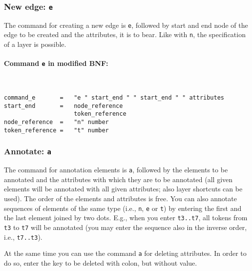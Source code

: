 \documentclass[12pt]{scrartcl}
\begin{document}
\subsubsection{New edge: \texttt{e}}

The command for creating a new edge is \texttt{e}, followed by start and end node of the edge to be created and the attributes, it is to bear.
Like with \texttt{n}, the specification of a layer is possible.

\paragraph*{Command \texttt{e} in modified BNF:}
~
\begin{framed}
\begin{lstlisting}
command_e       =   "e " start_end " " start_end " " attributes
start_end       =   node_reference
                    token_reference
node_reference  =   "n" number
token_reference =   "t" number
\end{lstlisting}
\end{framed}


\subsubsection{Annotate: \texttt{a}}\label{befehl-a}

The command for annotation elements is \texttt{a}, followed by the elements to be annotated and the attributes with which they are to be annotated (all given elements will be annotated with all given attributes; also layer shortcuts can be used).
The order of the elements and attributes is free.
You can also annotate sequences of elements of the same type (i.e., \texttt{n}, \texttt{e} or \texttt{t}) by entering the first and the last element joined by two dots.
E.g., when you enter \texttt{t3..t7}, all tokens from \texttt{t3} to \texttt{t7} will be annotated (you may enter the sequence also in the inverse order, i.e., \texttt{t7..t3}).

At the same time you can use the command \texttt{a} for deleting attributes.
In order to do so, enter the key to be deleted with colon, but without value.
\end{document}
